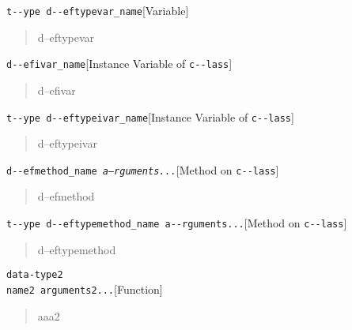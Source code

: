 \documentclass{book}
\begin{document}
\noindent\texttt{t{-}{-}ype d{-}{-}eftypevar\_name}\hfill[Variable]



%
\begin{quote}
\unskip{\parskip=0pt\noindent}%
d--eftypevar
\end{quote}

\noindent\texttt{d{-}{-}efivar\_name}\hfill[Instance Variable of \texttt{c{-}{-}lass}]



%
\begin{quote}
\unskip{\parskip=0pt\noindent}%
d--efivar
\end{quote}

\noindent\texttt{t{-}{-}ype d{-}{-}eftypeivar\_name}\hfill[Instance Variable of \texttt{c{-}{-}lass}]



%
\begin{quote}
\unskip{\parskip=0pt\noindent}%
d--eftypeivar
\end{quote}

\noindent\texttt{d{-}{-}efmethod\_name \EmbracOn{}\textnormal{\textsl{a--rguments...}}\EmbracOff{}}\hfill[Method on \texttt{c{-}{-}lass}]



%
\begin{quote}
\unskip{\parskip=0pt\noindent}%
d--efmethod
\end{quote}

\noindent\texttt{t{-}{-}ype d{-}{-}eftypemethod\_name a{-}{-}rguments...}\hfill[Method on \texttt{c{-}{-}lass}]



%
\begin{quote}
\unskip{\parskip=0pt\noindent}%
d--eftypemethod
\end{quote}


\noindent\texttt{data-type2\leavevmode{}\\name2 arguments2...}\hfill[Function]



%
\begin{quote}
\unskip{\parskip=0pt\noindent}%
aaa2
\end{quote}
\end{document}

